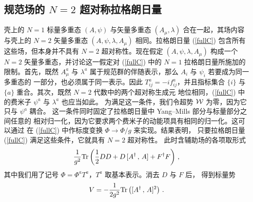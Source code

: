 
\subsection{规范场的 $N=2$ 超对称拉格朗日量}

壳上的 $N=1$ 标量多重态 $(A, \psi)$ 与矢量多重态 $(A_\mu,\lambda)$
合在一起，其场内容与壳上的 $N=2$ 矢量多重态 $(A,\psi,\lambda, A_\mu)$
相同。拉格朗日量 (\ref{fullC}) 包含所有这些场，但本身并不具有
$N=2$ 超对称性。现在假定 $(A,\psi,\lambda, A_\mu)$ 构成一个
$N=2$ 矢量多重态，并讨论这一假定对 (\ref{fullC}) 中的
$N=1$ 拉格朗日量所施加的限制。首先，既然 $A^a_\mu$ 与 $\lambda^a$
属于规范群的伴随表示，那么 $A_i$ 与 $\psi_i$ 若要成为同一多重态的
一部分，也必须属于同一表示。因此 $T^a_{ij}=-if^a_{ij}$，并且指标集合
$\{ i \}$ 与 $\{ a \}$ 重合。其次，既然 $N=2$ 代数中的两个超对称生成元
地位相同，(\ref{fullC}) 中的费米子 $\psi^a$ 与 $\lambda^a$ 也应当如此。
为满足这一条件，我们令超势 ${\cal W}$ 为零，因为它只与 $\psi^a$ 耦合。
这一条件同时固定了拉格朗日量中 Yang--Mills 部分与标量部分之间任意的
相对归一化，因为它要求两个费米子的动能项具有相同的归一化。这可以通过
在 (\ref{fullC}) 中作标度变换 $\Phi\rightarrow\Phi/g$ 来实现。结果表明，
只要拉格朗日量 (\ref{fullC}) 满足这些条件，它就具有 $N=2$ 超对称性。
此时含辅助场的各项取形式
$$
\frac{1}{g^2}{\rm Tr}\left(\frac{1}{2}DD +D\,[A^\dagger\,,\,A] + 
F^\dagger F \right)\,, 
$$
其中我们用了记号 $\Phi=\Phi^a T^a$，$T^a$ 取基本表示。消去 $D$ 与 $F$ 后，
得到标量势
\begin{equation}
V=- \frac{1}{2g^2} {\rm Tr}\left([A^\dagger\,,\,A]^2 \right)\,.
\label{scalarV}
\end{equation}

